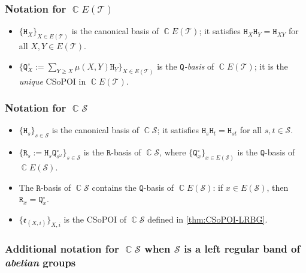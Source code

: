\documentclass[11pt, oneside, reqno]{amsart}
\theoremstyle{definition}
\numberwithin{equation}{section}
\DeclareMathOperator{\C}{\mathbb{C}}
\def \SS{{\mathcal{S}}}
\def \TT{{\mathcal{T}}}
\def \kk{\C}
\def \ee{{\mathfrak{e}}}
\newcommand{\B}[1]{\mathtt{#1}} 			%
\begin{document}
\subsubsection*{Notation for $\kk E(\TT)$}

\begin{itemize}[wide]
    \item
        $\{\B{H}_{X}\}_{X \in E(\TT)}$ is the canonical basis of $\kk E(\TT)$;
        it satisfies $\B{H}_{X} \B{H}_{Y} = \B{H}_{XY}$ for all $X, Y \in E(\TT)$.

    \item
        $\{\B{Q}^{\circ}_{X} := \sum_{Y \geq X} \mu(X,Y) \B{H}_Y\}_{X \in E(\TT)}$
        is the \emph{$\B{Q}$-basis} of $\kk E(\TT)$; it is the \emph{unique} CSoPOI in $\kk E(\TT)$.
\end{itemize}

\subsubsection*{Notation for $\kk \SS$}

\begin{itemize}[wide]
    \item
        $\{\B{H}_{s}\}_{s \in \SS}$ is the canonical basis of $\kk \SS$;
        it satisfies $\B{H}_{s} \B{H}_{t} = \B{H}_{st}$ for all $s, t \in \SS$.

    \item
        $\{\B{R}_{s} := \B{H}_{s} \B{Q}^\circ_{s^\omega}\}_{s \in \SS}$
        is the $\B{R}$-basis of $\kk \SS$,
        where $\{\B{Q}^\circ_{x}\}_{x \in E(\SS)}$ is the $\B{Q}$-basis of $\kk E(\SS)$.

    \item
        The $\B{R}$-basis of $\kk \SS$ contains the
        $\B{Q}$-basis of $\kk E(\SS)$:
        if $x \in E(\SS)$, then $\B{R}_{x} = \B{Q}^\circ_{x}$.

    \item
        $\{\ee_{(X, i)}\}_{X, i}$ is the CSoPOI of $\kk \SS$
        defined in \cref{thm:CSoPOI-LRBG}.
\end{itemize}

\subsubsection*{Additional notation for $\kk \SS$ when $\SS$ is a left regular band of \emph{abelian} groups}
\end{document}
